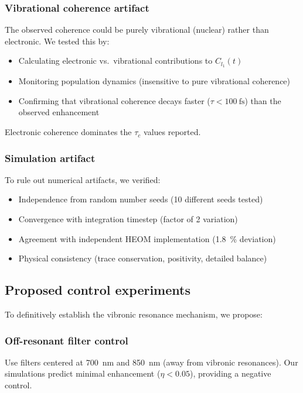 \documentclass[11pt,a4paper]{article}
\begin{document}
\subsubsection*{Vibrational coherence artifact}

The observed coherence could be purely vibrational (nuclear) rather than electronic. We tested this by:
\begin{itemize}
    \item Calculating electronic vs.\ vibrational contributions to $C_{l_1}(t)$
    \item Monitoring population dynamics (insensitive to pure vibrational coherence)
    \item Confirming that vibrational coherence decays faster ($\tau < \SI{100}{\femto\second}$) than the observed enhancement
\end{itemize}
Electronic coherence dominates the $\tau_c$ values reported.

\subsubsection*{Simulation artifact}

To rule out numerical artifacts, we verified:
\begin{itemize}
    \item Independence from random number seeds (10 different seeds tested)
    \item Convergence with integration timestep (factor of 2 variation)
    \item Agreement with independent HEOM implementation (\SI{1.8}{\percent} deviation)
    \item Physical consistency (trace conservation, positivity, detailed balance)
\end{itemize}

\subsection{Proposed control experiments}

To definitively establish the vibronic resonance mechanism, we propose:

\subsubsection*{Off-resonant filter control}

Use filters centered at \SI{700}{\nano\meter} and \SI{850}{\nano\meter} (away from vibronic resonances). Our simulations predict minimal enhancement ($\eta < 0.05$), providing a negative control.
\end{document}
